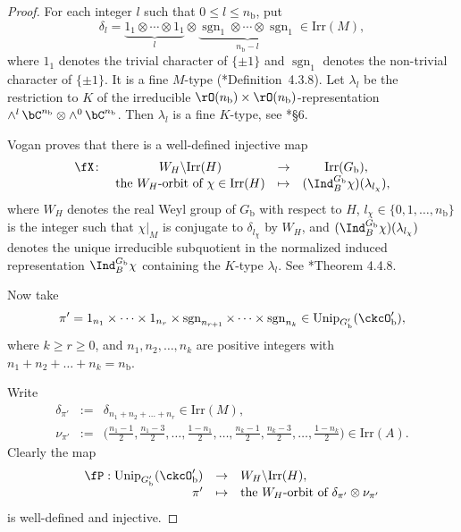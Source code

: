 \documentclass[12pt]{amsart}
\newcommand{\cusp}{{\mathrm{cusp}}}
\newcommand{\sgn}{\operatorname{sgn}}
\numberwithin{equation}{section}
\theoremstyle{remark}
\def\Irr{\mathrm{Irr}}
\def\Unip{\mathrm{Unip}}
\def\ckcOpb{\ckcO'_{\mathrm b}}
\def\nnb{n_{\mathrm b}}
\def\Gb{G_{\mathrm b}}
\def\Gpb{G'_{\mathrm b}}
\begin{document}
\begin{proof}
 For each integer $l$ such that $0\leq l \leq \nnb$, put
    \[
      \delta_{l} = \underbrace{1_{1}\otimes \cdots \otimes 1_{1}}_{l} \otimes
      \underbrace{\sgn_{1} \otimes \cdots \otimes \sgn_{1}}_{\nnb-l}\in \Irr(M),
    \]
    where $1_{1}$ denotes the trivial character of $\{\pm 1\}$ and $\sgn_{1}$ denotes the non-trivial character of $\{\pm 1\}$.
It is a fine $M$-type (\cite{Vg}*{Definition~4.3.8}). Let $\lambda_{l}$ be
    the restriction to $K$ of the irreducible
    $\rO(\nnb)\times \rO(\nnb)$-representation
    $\wedge^{l}\,\bC^{\nnb}\otimes \wedge^{0}\,\bC^{\nnb}$. Then $\lambda_{l}$ is a
    fine $K$-type, see \cite{BGG.M}*{\S 6}.

    \def\cusp{\fC}

    Vogan proves that there is a well-defined injective map
\[
      \begin{array}{lccc}
       \fX\colon &   W_H\backslash \Irr(H)&\rightarrow & \Irr(G_\mathrm b),\\
       & \textrm{the $W_H$-orbit of $\chi\in \Irr(H)$} & \mapsto & (\Ind_{B}^{\Gb}\chi)(\lambda_{l_\chi}),
      \end{array}
    \]
    where $W_H$ denotes the real Weyl group of $G_\mathrm b$ with respect to $H$,  $l_\chi\in\{0,1, \dots, n_\mathrm b\}$ is the integer such that $\chi|_M$ is conjugate to $\delta_{l_\chi}$ by $W_H$, and $(\Ind_{B}^{\Gb}\chi)(\lambda_{l_\chi})$ denotes the unique
    irreducible subquotient in the normalized induced representation
    $\Ind_{B}^{\Gb}\chi$ containing the $K$-type $\lambda_{l}$. See \cite{Vg}*{Theorem 4.4.8}.

        Now take
         \[
         \pi' = 1_{n_{1}}\times \cdots \times 1_{n_{r}}\times \sgn_{n_{r+1}}\times \cdots \times \sgn_{n_{k}}\in \Unip_{\Gpb}(\ckcOpb),
         \]
       where   $k\geq r\geq 0$,  and $n_1, n_2, \dots, n_k$ are positive integers with  $n_1+n_2+ \dots+ n_k=\nnb$.



    Write
    \begin{eqnarray*}
    \delta_{\pi'}&:=&\delta_{n_{1}+n_{2}+\dots + n_{r}}\in \Irr(M),\\
        \nu_{\pi'} &:=& \big( {\tfrac{n_{1}-1}{2},\tfrac{n_{1}-3}{2},\dots ,\tfrac{1-n_{1}}{2}, \dots , \tfrac{n_{k}-1}{2},\tfrac{n_{k}-3}{2},\dots ,\tfrac{1-n_{k}}{2}} \big)\in \Irr(A).
   \end{eqnarray*}
   Clearly the map
   \[
   \begin{array}{rcl}
     \fP:   \Unip_{\Gpb}(\ckcOpb)&\rightarrow &  W_H\backslash \Irr(H),\\
      \pi' &\mapsto & \textrm{the $W_H$-orbit of $\delta_{\pi'}\otimes \nu_{\pi'}$}
      \end{array}
      \]
       is well-defined and
    injective.


\end{proof}
\end{document}

